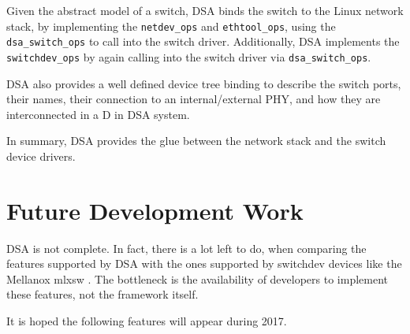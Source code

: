 \documentclass[letterpaper]{article}
\begin{document}
Given the abstract model of a switch, DSA binds the switch to the
Linux network stack, by implementing the \verb|netdev_ops| and
\verb|ethtool_ops|, using the \verb|dsa_switch_ops| to call into the
switch driver. Additionally, DSA implements the \verb|switchdev_ops|
by again calling into the switch driver via \verb|dsa_switch_ops|.

DSA also provides a well defined device tree binding to describe the
switch ports, their names, their connection to an internal/external
PHY, and how they are interconnected in a D in DSA system.

In summary, DSA provides the glue between the network stack and the
switch device drivers.

\section{Future Development Work}

DSA is not complete. In fact, there is a lot left to do, when
comparing the features supported by DSA with the ones supported by switchdev
devices like the
Mellanox mlxsw \cite{mlxsw}. The bottleneck is the availability of developers
to implement these features, not the framework itself.

It is hoped the following features will appear during 2017.
\end{document}
